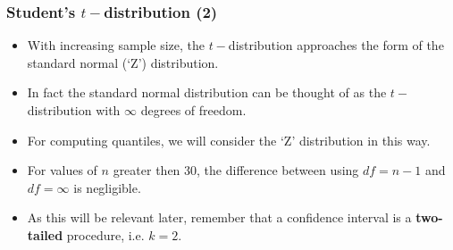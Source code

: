 \documentclass[a4]{beamer}
\begin{document}
\begin{frame}
\frametitle{Student's $t-$distribution (2)}
\begin{itemize}
\item With increasing
sample size, the $t-$distribution approaches the form of the standard normal (`Z') distribution.
\item In fact the standard normal distribution can be thought of as the $t-$distribution with $\infty$ degrees of freedom.
\item For computing quantiles, we will consider the `Z' distribution in this way.
\item For values of $n$ greater then 30, the difference between using $df = n-1$ and $df = \infty$ is negligible.

\item As this will be relevant later, remember that a confidence interval is a \textbf{two-tailed} procedure, i.e. $k=2$.
\end{itemize}
\end{frame}

\end{document}
